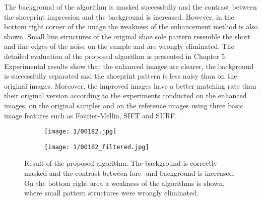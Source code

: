 \documentclass[draft,final]{vutinfth} %
\begin{document}
The background of the algorithm is masked successfully and the contrast between the shoeprint impression and the background is increased.
However, in the bottom right corner of the image the weakness of the enhancement method is also shown.
Small line structures of the original shoe sole pattern resemble the short and fine edges of the noise on the sample and are wrongly eliminated.
The detailed evaluation of the proposed algorithm is presented in Chapter 5.
Experimental results show that the enhanced images are clearer, the background is successfully separated and the shoeprint pattern is less noisy than on the original images.
Moreover, the improved images have a better matching rate than their original version according to the experiments conducted on the enhanced images, on the original samples and on the reference images using three basic image features such as Fourier-Mellin, SIFT and SURF.


\begin{figure}[h]
  \centering
  \begin{subfigure}[t]{0.45\columnwidth}
    \centering
    \texttt{[image: 1/00182.jpg]}
    \label{fig:intro:orig}
  \end{subfigure}
  \begin{subfigure}[t]{0.45\columnwidth}
    \centering
    \texttt{[image: 1/00182\_filtered.jpg]}
    \label{fig:intro:enhanced}
  \end{subfigure}
  \caption{Result of the proposed algorithm. The background is correctly masked and the contrast between fore- and background is increased. On the bottom right area a weakness of the algorithms is shown, where small pattern structures were wrongly eliminated.  }
  \label{fig:example}
\end{figure}
\end{document}
